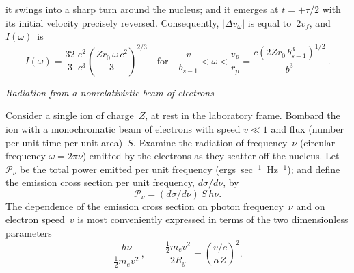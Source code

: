 %


\noindent it swings into a sharp turn around the nucleus; and it emerges
at $t = +\tau/2$ with its initial velocity precisely reversed.
Consequently, $|\Delta v_\omega|$ is equal to~$2v_f$, and $I(\omega)$~is
\begin{equation}
  I(\omega)
  = \frac{32}{3}\,\frac{e^{2}}{c^{3}}
    \left(\frac{Zr_0\,\omega\,c^{2}}{3}\right)^{\!2/3}
  \quad\text{for}\quad
  \frac{v}{b_{s-1}} < \omega < \frac{v_p}{r_p}
  = \frac{c(2Zr_0\,b_{s-1}^{3})^{1/2}}{b^{3}}\,.
  \tag{2.1.6b}
\end{equation}


\bigskip
\noindent\textit{Radiation from a nonrelativistic beam of electrons}

\medskip

Consider a single ion of charge~$Z$, at rest in the laboratory frame.
Bombard the ion with a monochromatic beam of electrons with speed
$v \ll 1$ and flux (number per unit time per unit area)~$S$.  Examine the
radiation of frequency~$\nu$ (circular frequency $\omega = 2\pi\nu$)
emitted by the electrons as they scatter off the nucleus.
Let $\mathscr{P}_\nu$ be the total power emitted per unit frequency
(ergs~sec$^{-1}$~Hz$^{-1}$); and define the emission cross section per
unit frequency, $d\sigma/d\nu$, by
\begin{equation}
  \mathscr{P}_\nu = (d\sigma/d\nu)\,S\,h\nu.
  \tag{2.1.7}
\end{equation}
The dependence of the emission cross section on photon frequency~$\nu$
and on electron speed~$v$ is most conveniently expressed in terms of
the two dimensionless parameters
\begin{equation}
  \frac{h\nu}{\tfrac{1}{2}m_e v^{2}}\,,
  \qquad
  \frac{\tfrac{1}{2}m_e v^{2}}{2R_y}
  = \left(\frac{v/c}{\alpha Z}\right)^{\!2}.
  \tag{2.1.8}
\end{equation}

